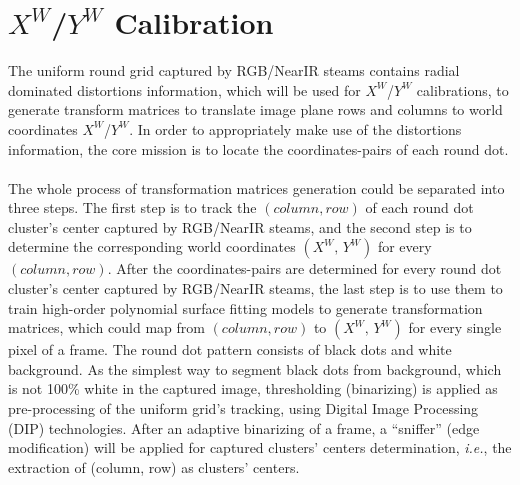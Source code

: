 \section{\(X^{W}\)/\(Y^{W}\) Calibration}
\label{sectionXY_calibration}
The uniform round grid captured by RGB/NearIR steams contains radial dominated distortions information, which will be used for \(X^{W}\)/\(Y^{W}\) calibrations, to generate transform matrices to translate image plane rows and columns to world coordinates \(X^{W}\)/\(Y^{W}\). In order to appropriately make use of the distortions information, the core mission is to locate the coordinates-pairs of each round dot. \\\\
%
The whole process of transformation matrices generation could be separated into three steps. %
The first step is to track the \((column, row)\) of each round dot cluster's center captured by RGB/NearIR steams, and the second step is to determine the corresponding world coordinates \((X^W, \,Y^W)\) for every \((column, row)\). After the coordinates-pairs are determined for every round dot cluster's center captured by RGB/NearIR steams, the last step is to use them to train high-order polynomial surface fitting models to generate transformation matrices, which could map from \((column, row)\) to \((X^W, \,Y^W)\) for every single pixel of a frame.
%
\label{RowColumnExtraction}
The round dot pattern consists of black dots and white background. As the simplest way to segment black dots from background, which is not 100\% white in the captured image, thresholding (binarizing) is applied as pre-processing of the uniform grid's tracking, using Digital Image Processing (DIP) technologies. After an adaptive binarizing of a frame, a \enquote{sniffer} (edge modification) will be applied for captured clusters' centers determination, \textit{i.e.}, the extraction of (column, row) as clusters' centers.\par
%
